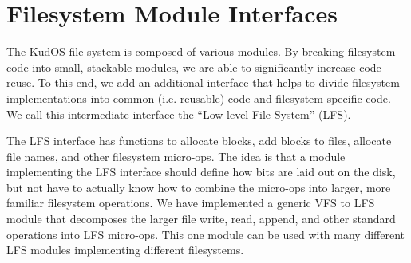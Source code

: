 \preparagraphspacing{}
\section*{Filesystem Module Interfaces}
\label{sec:interfaces}

The KudOS file system is composed of various modules. By breaking
filesystem code into small, stackable modules, we are able to
significantly increase code reuse. To this end, we add an additional
interface that helps to divide filesystem implementations into common
(i.e.  reusable) code and filesystem-specific code. We call this
intermediate interface the ``Low-level File System'' (LFS).

The LFS interface has functions to allocate blocks, add blocks to files,
allocate file names, and other filesystem micro-ops. The idea is that a module
implementing the LFS interface should define how bits are laid out on the
disk, but not have to actually know how to combine the micro-ops into larger,
more familiar filesystem operations. We have implemented a generic VFS to LFS
module that decomposes the larger file write, read, append, and other standard
operations into LFS micro-ops. This one module can be used with many different
LFS modules implementing different filesystems.
